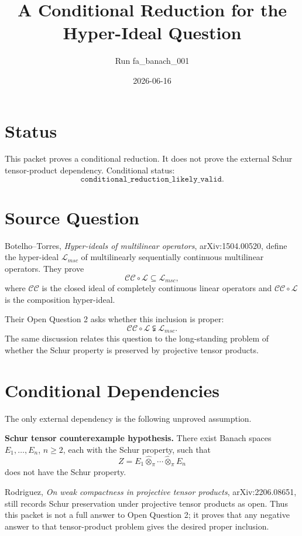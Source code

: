 \documentclass[11pt]{amsart}
\newcommand{\CC}{\mathcal{CC}}
\newcommand{\LLL}{\mathcal{L}}
\newcommand{\Lmsc}{\mathcal{L}_{msc}}
\newcommand{\tensorpi}{\widehat{\otimes}_{\pi}}
\begin{document}
\title{A Conditional Reduction for the Hyper-Ideal Question}
\author{Run fa\_banach\_001}
\date{2026-06-16}
\maketitle

\section*{Status}

This packet proves a conditional reduction. It does not prove the external
Schur tensor-product dependency. Conditional status:
\[
  \texttt{conditional\_reduction\_likely\_valid}.
\]

\section*{Source Question}

Botelho--Torres, \emph{Hyper-ideals of multilinear operators},
arXiv:1504.00520, define the hyper-ideal \(\Lmsc\) of multilinearly
sequentially continuous multilinear operators. They prove
\[
  \CC\circ\LLL \subseteq \Lmsc,
\]
where \(\CC\) is the closed ideal of completely continuous linear operators
and \(\CC\circ\LLL\) is the composition hyper-ideal.

Their Open Question 2 asks whether this inclusion is proper:
\[
  \CC\circ\LLL \subsetneqq \Lmsc.
\]
The same discussion relates this question to the long-standing problem of
whether the Schur property is preserved by projective tensor products.

\section*{Conditional Dependencies}

The only external dependency is the following unproved assumption.

\medskip
\noindent
\textbf{Schur tensor counterexample hypothesis.}
There exist Banach spaces \(E_1,\ldots,E_n\), \(n\geq 2\), each with the
Schur property, such that
\[
  Z=E_1\tensorpi\cdots\tensorpi E_n
\]
does not have the Schur property.

\medskip
Rodriguez, \emph{On weak compactness in projective tensor products},
arXiv:2206.08651, still records Schur preservation under projective tensor
products as open. Thus this packet is not a full answer to Open Question 2;
it proves that any negative answer to that tensor-product problem gives the
desired proper inclusion.
\end{document}
